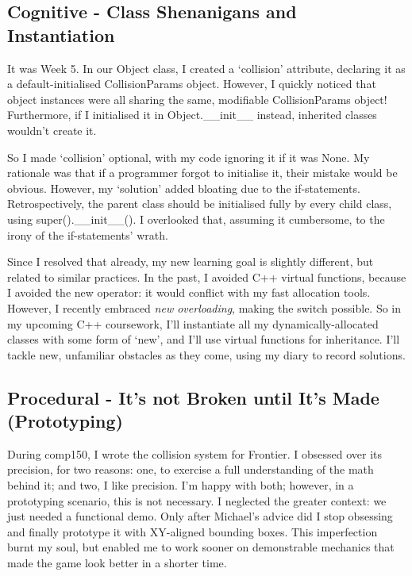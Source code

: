 \documentclass{scrartcl}
\begin{document}
\subsection{Cognitive - Class Shenanigans and Instantiation} %

It was Week 5. In our Object class, I created a `collision' attribute, declaring it as a default-initialised CollisionParams object. However, I quickly noticed that object instances were all sharing the same, modifiable CollisionParams object! Furthermore, if I initialised it in Object.\_\_init\_\_ instead, inherited classes wouldn't create it.

So I made `collision' optional, with my code ignoring it if it was None. My rationale was that if a programmer forgot to initialise it, their mistake would be obvious. However, my `solution' added bloating due to the if-statements. Retrospectively, the parent class should be initialised fully by every child class, using super().\_\_init\_\_(). I overlooked that, assuming it cumbersome, to the irony of the if-statements' wrath.

Since I resolved that already, my new learning goal is slightly different, but related to similar practices. In the past, I avoided C++ virtual functions, because I avoided the new operator: it would conflict with my fast allocation tools. However, I recently embraced \textit{new overloading}, making the switch possible. So in my upcoming C++ coursework, I'll instantiate all my dynamically-allocated classes with some form of `new', and I'll use virtual functions for inheritance. I'll tackle new, unfamiliar obstacles as they come, using my diary to record solutions.

\subsection{Procedural - It's not Broken until It's Made (Prototyping)} %

During comp150, I wrote the collision system for Frontier. I obsessed over its precision, for two reasons: one, to exercise a full understanding of the math behind it; and two, I like precision. I'm happy with both; however, in a prototyping scenario, this is not necessary. I neglected the greater context: we just needed a functional demo. Only after Michael's advice did I stop obsessing and finally prototype it with XY-aligned bounding boxes. This imperfection burnt my soul, but enabled me to work sooner on demonstrable mechanics that made the game look better in a shorter time. 
\end{document}
